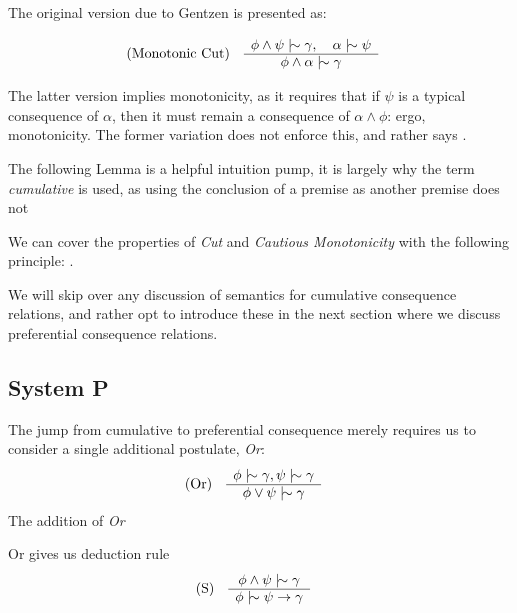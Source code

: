 The original version due to Gentzen \cite{Ben1993Mathematical} is presented as:

\begin{align}
  \inferLeft{Monotonic Cut}{\phi \land \psi \twiddle \gamma, \quad \alpha \twiddle \psi}{\phi \land \alpha \twiddle \gamma}
\end{align}

The latter version implies monotonicity, as it requires that if $\psi$ is a typical consequence of $\alpha$, then it must remain a
consequence of $\alpha \land \phi$: ergo, monotonicity. The former variation does not enforce this, and rather says .

The following Lemma is a helpful intuition pump, it is largely why the term \textit{cumulative} is used, as using the conclusion of a
premise as another premise does not \cite{gabbay1985theoreticalFoundations}

\begin{lemma}
  \label{lemma:cut-cautious} We can cover the properties of \emph{Cut} and \emph{Cautious Monotonicity} with the following principle: .
\end{lemma}

We will skip over any discussion of semantics for cumulative consequence relations, and rather opt to introduce these in the next section where
we discuss preferential consequence relations.

\subsection{System P}
\label{subsection:system-P}

The jump from cumulative to preferential consequence merely requires us to consider a single additional postulate, \textit{Or}:
%
\begin{align}
  \inferLeft{Or}{\phi \twiddle \gamma, \psi \twiddle \gamma}{\phi \lor \psi \twiddle \gamma}
\end{align}
The addition of \textit{Or}

Or gives us deduction rule
\begin{align}
  \inferLeft{S}{\phi \land \psi \twiddle \gamma}{\phi \twiddle \psi \rightarrow \gamma}
\end{align}

